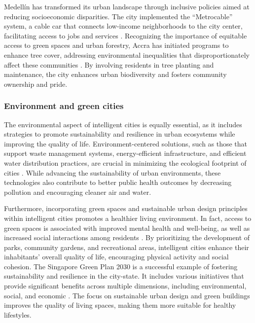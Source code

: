 \documentclass[smartcities,article,submit,pdftex,moreauthors]{Definitions/mdpi}
\begin{document}
Medellín has transformed its urban landscape through inclusive policies aimed at reducing socioeconomic disparities. The city implemented the ``Metrocable'' system, a cable car that connects low-income neighborhoods to the city center, facilitating access to jobs and services \citet{MetroCable}. Recognizing the importance of equitable access to green spaces and urban forestry, Accra has initiated programs to enhance tree cover, addressing environmental inequalities that disproportionately affect these communities \cite{AccraGreenSpaces}. By involving residents in tree planting and maintenance, the city enhances urban biodiversity and fosters community ownership and pride. 

\subsubsection{Environment and green cities}

The environmental aspect of intelligent cities is equally essential, as it includes strategies to promote sustainability and resilience in urban ecosystems while improving the quality of life. Environment-centered solutions, such as those that support waste management systems, energy-efficient infrastructure, and efficient water distribution practices, are crucial in minimizing the ecological footprint of cities \cite{IntegraedCity}. While advancing the sustainability of urban environments, these technologies also contribute to better public health outcomes by decreasing pollution and encouraging cleaner air and water.

Furthermore, incorporating green spaces and sustainable urban design principles within intelligent cities promotes a healthier living environment. In fact, access to green spaces is associated with improved mental health and well-being, as well as increased social interactions among residents 
\cite{GreenSpaces}. By prioritizing the development of parks, community gardens, and recreational areas, intelligent cities enhance their inhabitants' overall quality of life, encouraging physical activity and social cohesion. The Singapore Green Plan 2030 is a successful example of fostering sustainability and resilience in the city-state. It includes various initiatives that provide significant benefits across multiple dimensions, including environmental, social, and economic 
\cite{SingaporeGreenPlan}. The focus on sustainable urban design and green buildings improves the quality of living spaces, making them more suitable for healthy lifestyles.
\end{document}
